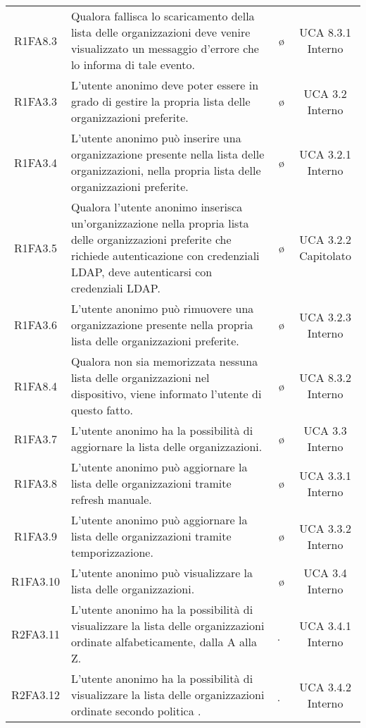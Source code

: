 {\begin{longtable}{ c C{6.5cm} c c}
R1FA8.3 & Qualora fallisca lo scaricamento della lista delle organizzazioni deve venire visualizzato un messaggio d'errore che lo informa di tale evento. & \o & UCA 8.3.1 Interno \\

R1FA3.3 & L’utente anonimo deve poter essere in grado di gestire la propria lista delle organizzazioni preferite. & \o & UCA 3.2 Interno \\

R1FA3.4 & L’utente anonimo può inserire una organizzazione presente nella lista delle organizzazioni, nella propria lista delle organizzazioni preferite. & \o & UCA 3.2.1 Interno \\

R1FA3.5 & Qualora l’utente anonimo inserisca un'organizzazione nella propria lista delle organizzazioni preferite che richiede autenticazione con credenziali LDAP, deve autenticarsi con credenziali LDAP. & \o & UCA 3.2.2 Capitolato\\

R1FA3.6 & L’utente anonimo può rimuovere una organizzazione presente nella propria lista delle organizzazioni preferite. & \o & UCA 3.2.3 Interno \\

R1FA8.4 & Qualora non sia memorizzata nessuna lista delle organizzazioni nel dispositivo, viene informato l’utente di questo fatto. & \o & UCA 8.3.2 Interno \\

R1FA3.7 & L’utente anonimo ha la possibilità di aggiornare la lista delle organizzazioni. & \o & UCA 3.3 Interno \\

R1FA3.8 & L’utente anonimo può aggiornare la lista delle organizzazioni tramite refresh manuale. & \o & UCA 3.3.1 Interno \\

R1FA3.9 & L’utente  anonimo può aggiornare la lista delle organizzazioni tramite temporizzazione. & \o & UCA 3.3.2 Interno \\

R1FA3.10 & L’utente anonimo può visualizzare la lista delle organizzazioni. & \o & UCA 3.4 Interno \\

R2FA3.11 & L’utente anonimo ha la possibilità di visualizzare la lista delle organizzazioni ordinate alfabeticamente, dalla A alla Z. & \d & UCA 3.4.1 Interno \\

R2FA3.12 & L’utente anonimo ha la possibilità di visualizzare la lista delle organizzazioni ordinate secondo politica . & \d & UCA 3.4.2 Interno \\


\end{longtable}}
